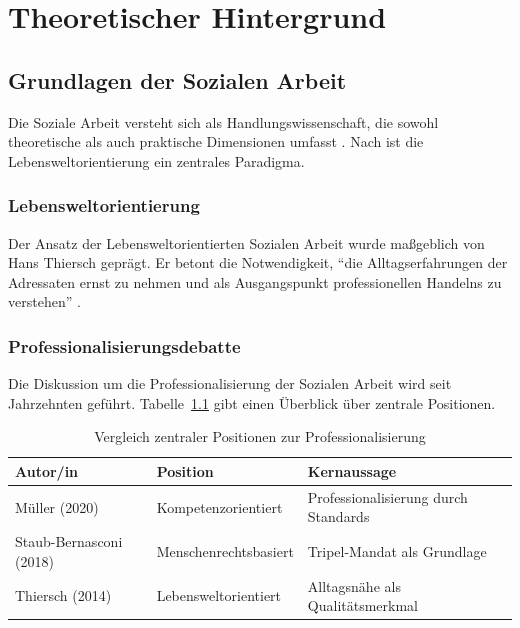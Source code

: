 \chapter{Theoretischer Hintergrund}
\label{ch:hauptteil}

\section{Grundlagen der Sozialen Arbeit}

Die Soziale Arbeit versteht sich als Handlungswissenschaft, die sowohl theoretische als auch praktische Dimensionen umfasst \parencite[vgl.][87]{thiersch2014}. Nach \textcite[15]{staub2018} ist die Lebensweltorientierung ein zentrales Paradigma.

\subsection{Lebensweltorientierung}

Der Ansatz der Lebensweltorientierten Sozialen Arbeit wurde maßgeblich von Hans Thiersch geprägt. Er betont die Notwendigkeit, \enquote{die Alltagserfahrungen der Adressaten ernst zu nehmen und als Ausgangspunkt professionellen Handelns zu verstehen} \parencite[23]{thiersch2014}.

\subsection{Professionalisierungsdebatte}

Die Diskussion um die Professionalisierung der Sozialen Arbeit wird seit Jahrzehnten geführt. Tabelle~\ref{tab:vergleich} gibt einen Überblick über zentrale Positionen.

\begin{table}[htbp]
    \centering
    \caption{Vergleich zentraler Positionen zur Professionalisierung}
    \label{tab:vergleich}
    \begin{tabularx}{\textwidth}{lXX}
        \toprule
        \textbf{Autor/in} & \textbf{Position} & \textbf{Kernaussage} \\
        \midrule
        Müller (2020) & Kompetenzorientiert & Professionalisierung durch Standards \\
        Staub-Bernasconi (2018) & Menschenrechtsbasiert & Tripel-Mandat als Grundlage \\
        Thiersch (2014) & Lebensweltorientiert & Alltagsnähe als Qualitätsmerkmal \\
        \bottomrule
    \end{tabularx}
\end{table}

